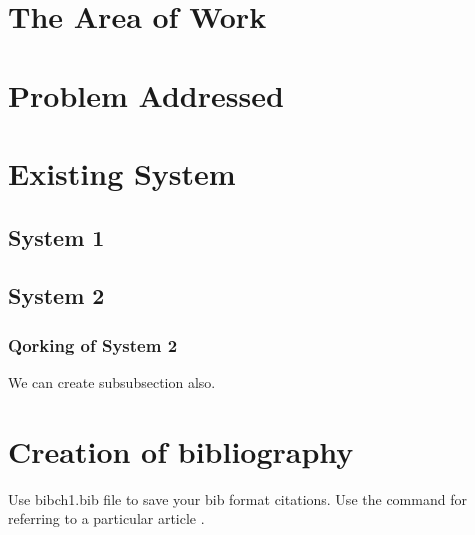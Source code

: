 \section{The Area of Work}
 
\blindtext


\section{Problem Addressed}
\blindtext

\section{Existing System}
\blindtext

\subsection{ System 1}
\blindtext

 \subsection{System 2}
 \subsubsection{Qorking of System 2}
 We can create subsubsection also. 
\section{Creation of bibliography}
Use bibch1.bib file to save your bib format citations. Use the command \cite{saini2010alternative} for referring to a particular article \cite{imre2006majority}. 





